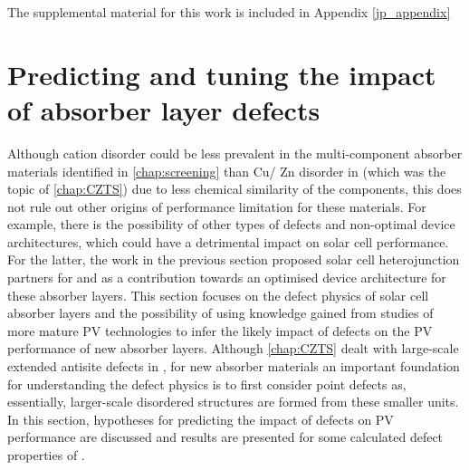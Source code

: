 \documentclass[11pt, twoside]{report}
\begin{document}
The supplemental material for this work is included in Appendix \ref{jp_appendix}








\section{Predicting and tuning the impact of absorber layer defects}\label{sulfosalt_defects}

Although cation disorder could be less prevalent in the multi-component absorber materials identified in \autoref{chap:screening} than Cu/ Zn disorder in {\CZTS} (which was the topic of \autoref{chap:CZTS}) due to less chemical similarity of the components, this does not rule out other origins of performance limitation for these materials. For example, there is the possibility of other types of defects and non-optimal device architectures, which could have a detrimental impact on solar cell performance. For the latter, the work in the previous section proposed solar cell heterojunction partners for {\enargite} and {\bournonite} as a contribution towards an optimised device architecture for these absorber layers. This section focuses on the defect physics of solar cell absorber layers and the possibility of using knowledge gained from studies of more mature PV technologies to infer the likely impact of defects on the PV performance of new absorber layers. Although \autoref{chap:CZTS} dealt with large-scale extended antisite defects in {\CZTS}, for new absorber materials an important foundation for understanding the defect physics is to first consider point defects as, essentially, larger-scale disordered structures are formed from these smaller units. In this section, hypotheses for predicting the impact of defects on PV performance are discussed and results are presented for some calculated defect properties of {\enargite}.
\end{document}
